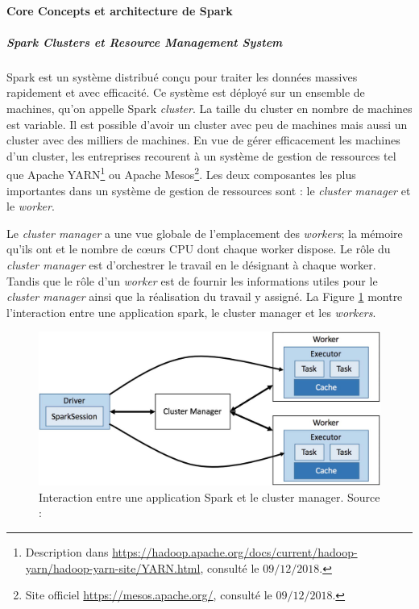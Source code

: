 \paragraph{Core Concepts et architecture de Spark}

\subparagraph{Spark Clusters et Resource Management System}

Spark est un système distribué conçu pour traiter les données massives rapidement et avec efficacité. Ce système est déployé sur un ensemble de machines, qu'on appelle Spark \textit{cluster}. La taille du cluster en nombre de machines est variable. Il est possible d'avoir un cluster avec peu de machines mais aussi un cluster avec des milliers de machines. En vue de gérer efficacement les machines d'un cluster, les entreprises recourent à un système de gestion de ressources tel que Apache YARN\footnote{Description dans \url{https://hadoop.apache.org/docs/current/hadoop-yarn/hadoop-yarn-site/YARN.html}, consulté le $09/12/2018$.} ou Apache Mesos\footnote{Site officiel \url{https://mesos.apache.org/}, consulté le $09/12/2018$.}. Les deux composantes les plus importantes dans un système de gestion de ressources sont : le \textit{cluster manager} et le \textit{worker}.

Le \textit{cluster manager} a une vue globale de l'emplacement des \textit{workers}; la mémoire qu'ils ont et le nombre de c\oe{}urs CPU dont chaque worker dispose. Le rôle du \textit{cluster manager} est d'orchestrer le travail en le désignant à chaque worker. Tandis que le rôle d'un \textit{worker} est de fournir les informations utiles pour le \textit{cluster manager} ainsi que la réalisation du travail y assigné. La Figure \ref{fig:cluster-overview} montre l'interaction entre une application spark, le cluster manager et les \textit{workers}.


\begin{figure}[H]
	\centering
	\captionsetup{justification= centering}
	\includegraphics[width=0.7\linewidth]{illustrations/cluster-overview.jpg}
	\caption{ Interaction entre une application Spark et le cluster manager. Source : \cite{eginning-Apache-Spark-2-cluster-overwiew}}
	\label{fig:cluster-overview}
\end{figure}




